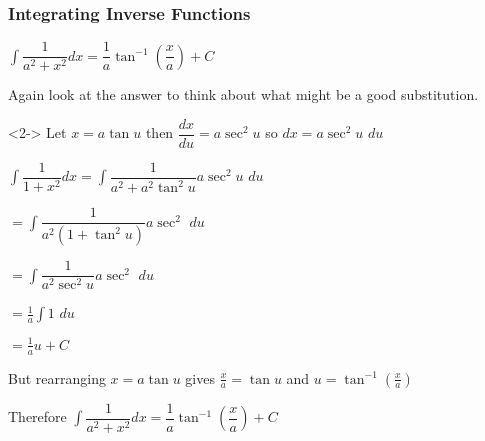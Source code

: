 \documentclass{beamer}
\begin{document}
	\begin{frame}[shrink=30]
		\frametitle{Integrating Inverse Functions}
		\begin{definition}
			$\int \dfrac{1}{a^{2}+x^{2}}dx=\dfrac{1}{a}\tan ^{-1}\left( \dfrac{x}{a}\right) +C$
		\end{definition}
		\alert{Again look at the answer to think about what might be a good substitution.}
		
		\begin{solution}<2->
			Let $x=a\tan u$ then $\dfrac{dx}{du} = a \sec^{2} u$ so $dx = a \sec^{2} u$ $du$
			
			$\int \dfrac{1}{1+x^{2}} dx =\int \dfrac{1}{a^{2}+a^{2}\tan^{2}u}a \sec^{2}u$ $du$
			
			\hspace*{55pt}$=\int \dfrac{1}{a^{2}(1+\tan ^{2}u)}a \sec^{2}$ $du$
			
			\hspace*{55pt}$=\int \dfrac{1}{a^{2} \sec^{2} u}a \sec^{2}$ $du$
			
			\hspace*{55pt}$=\frac{1}{a}\int 1$ $du$
			
			\hspace*{55pt}$= \frac{1}{a}u+C$
			
			But rearranging $x=a\tan u$ gives $\frac{x}{a} = \tan u$ and $u = \tan ^{-1}(\frac{x}{a})$
			
			Therefore $\int \dfrac{1}{a^{2}+x^{2}}dx=\dfrac{1}{a}\tan ^{-1}\left( \dfrac{x}{a}\right) +C$
			
		\end{solution}
	\end{frame}
	
\end{document}
